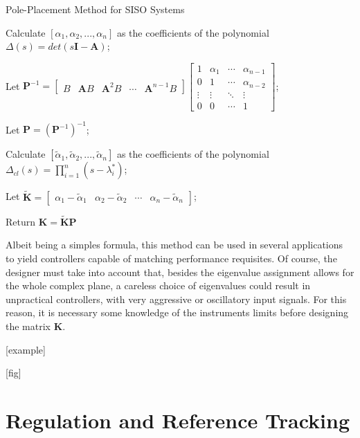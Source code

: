 \documentclass[a4paper,11pt]{book}
\numberwithin{figure}{chapter}
\numberwithin{equation}{chapter}
\numberwithin{table}{chapter}
\theoremstyle{definition}
\begin{document}
\begin{algorithm}[ht]
	\caption{Pole-Placement Method for SISO Systems}	
	\SetAlgoLined
	
	\vskip0.25cm
	
	Calculate $[\alpha_1, \alpha_2, ..., \alpha_n]$ as the coefficients of the polynomial $\Delta(s) = det(s\bm{I} - \bm{A})$;
	
	Let $\bm{P}^{-1} = \begin{bmatrix} B & \bm{A} B & \bm{A}^2 B & \cdots & \bm{A}^{n-1} B \end{bmatrix} \begin{bmatrix}
		1 & \alpha_1 & \cdots  & \alpha_{n-1} \\
		0 & 1 & \cdots & \alpha_{n-2} \\
		\vdots & \vdots & \ddots & \vdots \\
		0 & 0 & \cdots &1
		\end{bmatrix}$;
	
	Let $\bm{P} = \left( \bm{P}^{-1} \right)^{-1}$;
	
	Calculate $[\tilde{\alpha}_1, \tilde{\alpha}_2, ..., \tilde{\alpha}_n]$ as the coefficients of the polynomial $\Delta_{cl}(s) = \prod_{i=1}^n (s - \lambda^*_i)$;
	
	Let $\tilde{\bm{K}} = \begin{bmatrix} \alpha_1 - \tilde{\alpha}_1 & \alpha_2 - \tilde{\alpha}_2 & \cdots & \alpha_n - \tilde{\alpha}_n \end{bmatrix}$;
	
	Return $\bm{K} = \tilde{\bm{K}} \bm{P}$
\end{algorithm} 

Albeit being a simples formula, this method can be used in several applications to yield controllers capable of matching performance requisites. Of course, the designer must take into account that, besides the eigenvalue assignment allows for the whole complex plane, a careless choice of eigenvalues could result in unpractical controllers, with very aggressive or oscillatory input signals. For this reason, it is necessary some knowledge of the instruments limits before designing the matrix $\bm{K}$.

[example]

[fig]

\section{Regulation and Reference Tracking}
\end{document}
